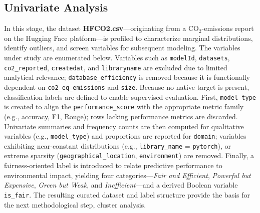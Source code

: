 \documentclass[journal]{IEEEtran}
\begin{document}
	\subsection{Univariate Analysis}
	In this stage, the dataset \textbf{HFCO2.csv}—originating from a $\text{CO}_2$-emissions report on the Hugging Face platform—is profiled to characterize marginal distributions, identify outliers, and screen variables for subsequent modeling. The variables under study are enumerated below. Variables such as \texttt{modelId}, \texttt{datasets}, \texttt{co2\_reported}, \texttt{createdat}, and \texttt{libraryname} are excluded due to limited analytical relevance; \texttt{database\_efficiency} is removed because it is functionally dependent on \texttt{co2\_eq\_emissions} and \texttt{size}.
	Because no native target is present, classification labels are defined to enable supervised evaluation. First, \texttt{model\_type} is created to align the \texttt{performance\_score} with the appropriate metric family (e.g., accuracy, F1, Rouge); rows lacking performance metrics are discarded. Univariate summaries and frequency counts are then computed for qualitative variables (e.g., \texttt{model\_type}) and proportions are reported for \texttt{domain}; variables exhibiting near-constant distributions (e.g., \texttt{library\_name} = \texttt{pytorch}), or extreme sparsity (\texttt{geographical\_location}, \texttt{environment}) are removed.
	Finally, a fairness-oriented label is introduced to relate predictive performance to environmental impact, yielding four categories—\emph{Fair and Efficient}, \emph{Powerful but Expensive}, \emph{Green but Weak}, and \emph{Inefficient}—and a derived Boolean variable \texttt{is\_fair}. The resulting curated dataset and label structure provide the basis for the next methodological step, cluster analysis.
\end{document}
